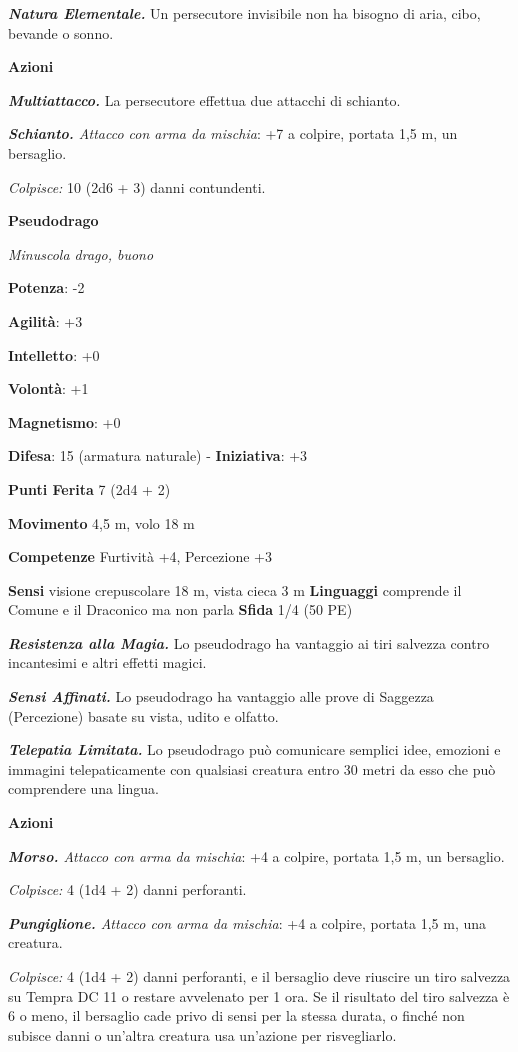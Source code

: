 \begin{multicols}{2}
\emph{\textbf{Natura Elementale.}} Un persecutore invisibile non ha
bisogno di aria, cibo, bevande o sonno.

\textbf{Azioni}

\emph{\textbf{Multiattacco.}} La persecutore effettua due attacchi di
schianto.

\emph{\textbf{Schianto.} Attacco con arma da mischia}: +7 a colpire,
portata 1,5 m, un bersaglio.

\emph{Colpisce:} 10 (2d6 + 3) danni contundenti.

\textbf{Pseudodrago}

\emph{Minuscola drago, buono}

\textbf{Potenza}: -2

\textbf{Agilità}: +3

\textbf{Intelletto}: +0

\textbf{Volontà}: +1

\textbf{Magnetismo}: +0

\textbf{Difesa}: 15 (armatura naturale) - \textbf{Iniziativa}: +3

\textbf{Punti Ferita} 7 (2d4 + 2)

\textbf{Movimento} 4,5 m, volo 18 m

\textbf{Competenze} Furtività +4, Percezione +3

\textbf{Sensi} visione crepuscolare 18 m, vista cieca 3 m
\textbf{Linguaggi} comprende il Comune e il Draconico ma non parla
\textbf{Sfida} 1/4 (50 PE)

\emph{\textbf{Resistenza alla Magia.}} Lo pseudodrago ha vantaggio ai
tiri salvezza contro incantesimi e altri effetti magici.

\emph{\textbf{Sensi Affinati.}} Lo pseudodrago ha vantaggio alle prove
di Saggezza (Percezione) basate su vista, udito e olfatto.

\emph{\textbf{Telepatia Limitata.}} Lo pseudodrago può comunicare
semplici idee, emozioni e immagini telepaticamente con qualsiasi
creatura entro 30 metri da esso che può comprendere una lingua.

\textbf{Azioni}

\emph{\textbf{Morso.} Attacco con arma da mischia}: +4 a colpire,
portata 1,5 m, un bersaglio.

\emph{Colpisce:} 4 (1d4 + 2) danni perforanti.

\emph{\textbf{Pungiglione.} Attacco con arma da mischia}: +4 a colpire,
portata 1,5 m, una creatura.

\emph{Colpisce:} 4 (1d4 + 2) danni perforanti, e il bersaglio deve
riuscire un tiro salvezza su Tempra DC 11 o restare avvelenato per
1 ora. Se il risultato del tiro salvezza è 6 o meno, il bersaglio cade
privo di sensi per la stessa durata, o finché non subisce danni o
un'altra creatura usa un'azione per risvegliarlo.



\end{multicols}
